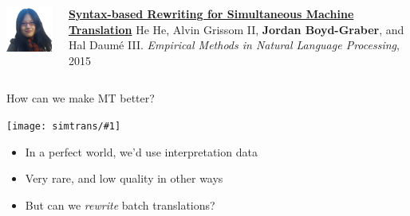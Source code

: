 \documentclass[compress]{beamer}
\newcommand{\gfxs}[2]{
\begin{center}
	\texttt{[image: simtrans/\#1]}
\end{center}
}
\begin{document}
\begin{frame}{}

  \begin{columns}
        \includegraphics[width=0.8\linewidth]{general_figures/hehe}
        \begin{block}{ {\bf \href{http://cs.colorado.edu/~jbg//docs/2015_emnlp_rewrite.pdf}{Syntax-based Rewriting for Simultaneous Machine Translation}}}
He He, Alvin Grissom II, {\bf Jordan Boyd-Graber}, and Hal {Daum\'{e} III}.  \emph{Empirical Methods in Natural Language Processing}, 2015
        \end{block}
  \end{columns}
\end{frame}

\begin{frame}{How can we make MT better?}

  \gfxs{en_ja_example}{.9}

  \pause

  \begin{itemize}
    \item In a perfect world, we'd use interpretation data
      \pause
      \item Very rare, and low quality in other ways
      \pause
    \item But can we \emph{rewrite} batch translations?
  \end{itemize}

\end{frame}
\end{document}
